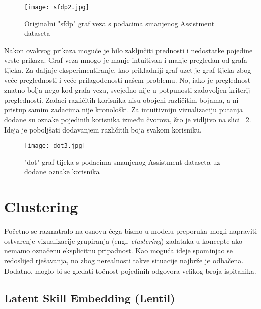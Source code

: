 \begin{figure}[H]
\centering
\texttt{[image: sfdp2.jpg]}
\caption{Originalni "sfdp" graf veza s podacima smanjenog Assistment dataseta}
\label{fig:sfdp2}
\end{figure}

\noindent Nakon ovakvog prikaza moguće je bilo zaključiti prednosti i nedostatke pojedine vrste prikaza.\newline
Graf veza mnogo je manje intuitivan i manje pregledan od grafa tijeka. Za daljnje eksperimentiranje, kao prikladniji graf uzet je graf tijeka zbog veće preglednosti i veće prilagođenosti našem problemu. No, iako je preglednost znatno bolja nego kod grafa veza, svejedno nije u potpunosti zadovoljen kriterij preglednosti. Zadaci različitih korisnika nisu obojeni različitim bojama, a ni pristup samim zadacima nije kronološki.\newline
Za intuitivniju vizualizaciju putanja dodane su oznake pojedinih korisnika između čvorova, što je vidljivo na slici ~\ref{fig:dot3}. Ideja je poboljšati dodavanjem različitih boja svakom korisniku. 

\begin{figure}[!htb]
\centering
\texttt{[image: dot3.jpg]}
\caption{"dot" graf tijeka s podacima smanjenog Assistment dataseta uz dodane oznake korisnika}
\label{fig:dot3}
\end{figure}

\chapter{Clustering}
Početno se razmatralo na osnovu čega bismo u modelu preporuka mogli napraviti ostvarenje vizualizacije grupiranja (engl. \textit{clustering}) zadataka u koncepte ako nemamo označenu eksplicitnu pripadnost. Kao moguća ideje spominjao se redoslijed rješavanja, no zbog nerealnosti takve situacije najbrže je odbačena. Dodatno, moglo bi se gledati točnost pojedinih odgovora velikog broja ispitanika.

\section{Latent Skill Embedding (Lentil)}

